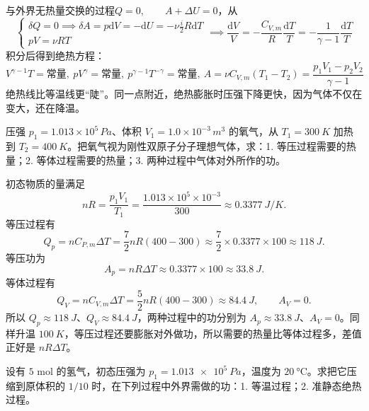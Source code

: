 \documentclass[lang=cn,11pt]{elegantbook}
\begin{document}
\begin{definition}[绝热过程]
    与外界无热量交换的过程\(Q=0,\qquad A+\Delta U=0\)，从
\[\begin{cases}\delta Q=0\implies \delta A=p\mathrm dV=-\mathrm dU=-\nu \frac{i}{2}R\mathrm dT\\
pV=\nu RT\end{cases}\implies \frac{\mathrm dV}{V}=-\frac{C_{V,m}}{R}\frac{\mathrm dT}{T}
=-\frac{1}{\gamma-1}\frac{\mathrm dT}{T}\]积分后得到绝热方程：
\[
V^{\gamma-1}T=\text{常量},~ pV^\gamma=\text{常量},~p^{\gamma-1}T^{-\gamma}=\text{常量},~A=\nu C_{V,m}(T_1-T_2)=\frac{p_1V_1-p_2V_2}{\gamma-1}
\]
绝热线比等温线更“陡”。同一点附近，绝热膨胀时压强下降更快，因为气体不仅在变大，还在降温。
\end{definition}





\begin{exercise}
压强 \(p_1=1.013\times10^5\,\si{Pa}\)、体积 \(V_1=1.0\times10^{-3}\,\si{m^3}\) 的氧气，从 \(T_1=\SI{300}{K}\) 加热到 \(T_2=\SI{400}{K}\)。把氧气视为刚性双原子分子理想气体，求：1. 等压过程需要的热量；2. 等体过程需要的热量；3. 两种过程中气体对外所作的功。
\end{exercise}

\begin{solution}
初态物质的量满足
 \[nR=\frac{p_1V_1}{T_1} =\frac{1.013\times10^5\times10^{-3}}{300} \approx \SI{0.3377}{J/K}.\]
等压过程有
 \[Q_p=nC_{P,m}\Delta T =\frac72 nR(400-300) \approx \frac72\times0.3377\times100 \approx \SI{118}{J}.\]
等压功为
 \[A_p=nR\Delta T \approx 0.3377\times100 \approx \SI{33.8}{J}.\]
等体过程有
 \[Q_V=nC_{V,m}\Delta T =\frac52 nR(400-300) \approx \SI{84.4}{J}, \qquad A_V=0.\]
所以 \(Q_p\approx\SI{118}{J}\)、\(Q_V\approx\SI{84.4}{J}\)，两种过程中的功分别为 \(A_p\approx\SI{33.8}{J}\)、\(A_V=0\)。同样升温 \(\SI{100}{K}\)，等压过程还要膨胀对外做功，所以需要的热量比等体过程多，差值正好是 \(nR\Delta T\)。
\end{solution}


\begin{exercise}
设有 \(5\) mol 的氢气，初态压强为 \(p_1=\SI{1.013e5}{Pa}\)，温度为 \(\SI{20}{\celsius}\)。求把它压缩到原体积的 \(1/10\) 时，在下列过程中外界需做的功：1. 等温过程；2. 准静态绝热过程。
\end{exercise}
\end{document}
